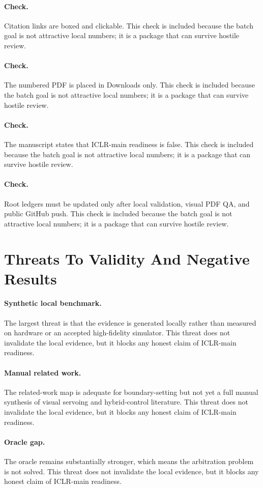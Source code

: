 \documentclass{article}
\begin{document}
\paragraph{Check.} Citation links are boxed and clickable. This check is included because the batch goal is not attractive local numbers; it is a package that can survive hostile review.
\paragraph{Check.} The numbered PDF is placed in Downloads only. This check is included because the batch goal is not attractive local numbers; it is a package that can survive hostile review.
\paragraph{Check.} The manuscript states that ICLR-main readiness is false. This check is included because the batch goal is not attractive local numbers; it is a package that can survive hostile review.
\paragraph{Check.} Root ledgers must be updated only after local validation, visual PDF QA, and public GitHub push. This check is included because the batch goal is not attractive local numbers; it is a package that can survive hostile review.
\clearpage
\section{Threats To Validity And Negative Results}
\paragraph{Synthetic local benchmark.} The largest threat is that the evidence is generated locally rather than measured on hardware or an accepted high-fidelity simulator. This threat does not invalidate the local evidence, but it blocks any honest claim of ICLR-main readiness.
\paragraph{Manual related work.} The related-work map is adequate for boundary-setting but not yet a full manual synthesis of visual servoing and hybrid-control literature. This threat does not invalidate the local evidence, but it blocks any honest claim of ICLR-main readiness.
\paragraph{Oracle gap.} The oracle remains substantially stronger, which means the arbitration problem is not solved. This threat does not invalidate the local evidence, but it blocks any honest claim of ICLR-main readiness.
\end{document}
